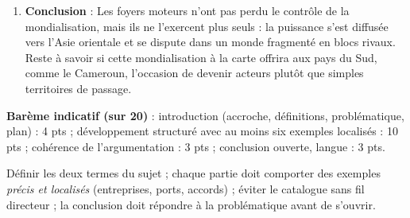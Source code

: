 \documentclass[11pt]{article}
\newcommand{\cle}[1]{{\popxbold\color{popdark}#1}}
\begin{document}
\begin{corrige}
\begin{enumerate}
\textbf{III.} La mondialisation devient \og fragmentée \fg{} : blocs régionaux (USMCA, UE, RCEP asiatique), sanctions, relocalisations. Le Sud cherche sa place : la \cle{ZLECAf} (2021) veut créer un marché africain intégré ; le Cameroun mise sur son port de Kribi et sa position de corridor pour le Tchad et la Centrafrique. Le contrôle ne disparaît pas : il se partage et se négocie.
\item \textbf{Conclusion} : Les foyers moteurs n'ont pas perdu le contrôle de la mondialisation, mais ils ne l'exercent plus seuls : la puissance s'est diffusée vers l'Asie orientale et se dispute dans un monde fragmenté en blocs rivaux. Reste à savoir si cette mondialisation \og à la carte \fg{} offrira aux pays du Sud, comme le Cameroun, l'occasion de devenir acteurs plutôt que simples territoires de passage.
\end{enumerate}
\textbf{Barème indicatif (sur 20)} : introduction (accroche, définitions, problématique, plan) : 4 pts ; développement structuré avec au moins six exemples localisés : 10 pts ; cohérence de l'argumentation : 3 pts ; conclusion ouverte, langue : 3 pts.
\begin{attention}
Définir les deux termes du sujet ; chaque partie doit comporter des exemples \emph{précis et localisés} (entreprises, ports, accords) ; éviter le catalogue sans fil directeur ; la conclusion doit répondre à la problématique avant de s'ouvrir.
\end{attention}
\end{corrige}
\end{document}
